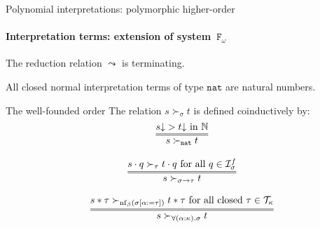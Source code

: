 \documentclass[10pt,presentation,color=names]{beamer}
\newcommand{\Fomega}{\mathtt{F}_\omega}
\newcommand{\Iterms}{\mathcal{I}}
\newcommand{\arrtype}{\rightarrow}
\newcommand{\app}[2]{#1 \cdot #2}
\newcommand{\tapp}[2]{#1 * #2}
\newcommand{\subst}[2]{#1:=#2}
\newcommand{\nat}{\mathtt{nat}}
\newcommand{\Tc}{\mathcal{T}}
\newcommand{\nf}{\mathrm{nf}}
\newcommand{\da}{\mathord{\downarrow}}
\begin{document}
%
%

\begin{frame}{Polynomial interpretations: polymorphic higher-order}
  \framesubtitle{Interpretation terms: extension of system~$\Fomega$}
  \begin{theorem}
    The reduction relation $\leadsto$ is terminating.
  \end{theorem}
  \pause
  \begin{corollary}
    All closed normal interpretation terms of type $\nat$ are natural
    numbers.
  \end{corollary}
\end{frame}

\begin{frame}{The well-founded order}
  The relation $s \succ_{\sigma} t$ is defined coinductively by:
  \[
  \begin{array}{c}
    \infer={s \succ_\nat t}{s\da > t\da \text{ in }\mathbb{N}} \\ \\
    \infer={s \succ_{\sigma\arrtype\tau} t}{\app{s}{q} \succ_{\tau} \app{t}{q} \text{ for all } q \in \Iterms^f_\sigma} \\ \\
    \infer={s \succ_{\forall(\alpha:\kappa).\sigma} t}{\tapp{s}{\tau} \succ_{\nf_\beta(\sigma[\subst{\alpha}{\tau}])} \tapp{t}{\tau} \text{ for all closed } \tau \in \Tc_{\kappa}}
  \end{array}
  \]


\end{frame}
\end{document}
